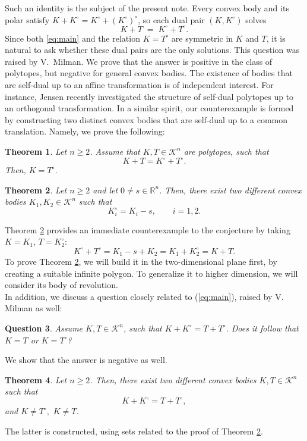 \documentclass[12pt]{article}
\newtheorem{theorem}{Theorem}
\newtheorem{question}[theorem]{Question}
\theoremstyle{remark}
\newcommand{\R}{\mathbb R}
\newcommand{\Kn}{\mathcal{K}^n}
\newcommand{\pol}[1]{#1^{\circ}}
\begin{document}
Such an identity is the subject of the present note. Every convex body and its polar
satisfy $K + \pol{K} = \pol{K} + \pol{(\pol{K})}$, so each dual pair
$(K, \pol{K})$ solves
\begin{equation}\label{eq:main}
  K + T \;=\; \pol{K} + \pol{T}.
\end{equation}
Since both \eqref{eq:main} and the relation $K = \pol{T}$ are symmetric in $K$ and
$T$, it is natural to ask whether these dual pairs are the only solutions. This
question was raised by V.~Milman. We prove that the answer is positive in the class of polytopes, but negative for general convex bodies.
The existence of bodies that are self-dual up to an affine transformation is of independent interest. For instance, Jensen \cite{jensen} recently investigated the structure of self-dual polytopes  up to an orthogonal transformation. In a similar spirit, our counterexample is formed by constructing two distinct convex bodies that are self-dual up to a common translation. Namely, we prove the following:

\begin{theorem} \label{thm-main-polyopes}
Let $n \geq 2$. Assume that $K, T \in \Kn$ are polytopes, such that
\[
K + T = K^\circ + T^\circ.
\]
Then, $K=T^\circ$.
\end{theorem}


\begin{theorem} \label{thm-main1}
Let $n \geq 2$ and let $0\neq s \in \R^n$. Then, there exist two different convex bodies $K_1, K_2 \in \Kn$ such that 
\[
K_i^\circ = K_i - s, \qquad i=1,2.
\]
\end{theorem}
Theorem \ref{thm-main1} provides an immediate counterexample to the conjecture by taking $K = K_1, \, T=K_2^\circ$:
\[
K^\circ + T^\circ = K_1 - s + K_2 = K_1 + K_2^\circ = K + T.
\]
To prove Theorem \ref{thm-main1}, we will build it in the two-dimensional plane first, by creating a suitable infinite polygon. To generalize it to higher dimension, we will consider its body of revolution. \\
In addition, we discuss a question closely related to (\ref{eq:main}), raised by V. Milman as well: 
\begin{question}
    Assume $K,T \in \Kn$, such that $K + K^\circ = T + T^\circ$. Does it follow that $K=T$ or $K=T^\circ$?
\end{question}
We show that the answer is negative as well.
\begin{theorem} \label{thm-main2}
Let $n \geq 2$. Then, there exist two different convex bodies $K, T \in \Kn$ such that 
\[
K + K^\circ = T + T^\circ,
\]
and $K\neq T^\circ, \,\, K \neq T$.
\end{theorem}
The latter is constructed, using sets related to the proof of Theorem \ref{thm-main1}. 
\end{document}
